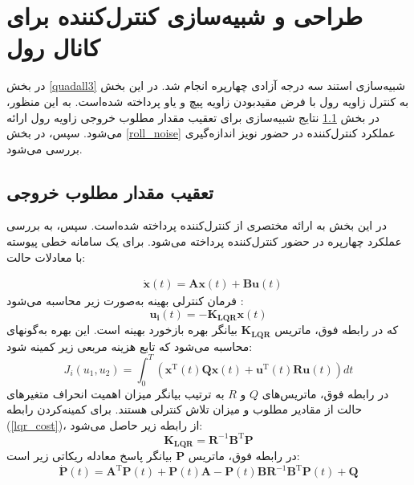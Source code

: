 \section{طراحی و شبیه‌سازی کنترل‌کننده برای کانال رول}\label{roll_lqr_section_simulation}
در بخش
\ref{quadall3}
شبیه‌سازی استند سه درجه آزادی چهارپره انجام شد.
در این بخش به کنترل زاویه رول با فرض مقید‌بودن زاویه پیچ و یاو پرداخته شده‌است. به این منظور، در بخش
\ref{roll_regulator}
نتایج شبیه‌سازی برای تعقیب مقدار مطلوب خروجی زاویه رول ارائه می‌شود. سپس، در بخش
\ref{roll_noise}
عملکرد کنترل‌کننده در  حضور نویز اندازه‌گیری بررسی می‌شود.
\subsection{تعقیب مقدار مطلوب خروجی}\label{roll_regulator}


 در این بخش به ارائه مختصری از کنترل‌کننده  پرداخته شده‌است. سپس، به بررسی عملکرد چهارپره در حضور کنترل‌کننده  پرداخته می‌شود.
 برای یک سامانه خطی پیوسته با معادلات حالت:

\begin{equation}
	\begin{split}
		&\boldsymbol{\dot x}(t) = \boldsymbol{Ax}(t) + \boldsymbol{Bu}(t) %
	\end{split}
\end{equation}
فرمان کنترلی بهینه  به‌صورت زیر محاسبه می‌شود
\cite{ogata2010modern}:
\begin{equation}
		\boldsymbol{u_i}(t) = -\boldsymbol{K_{LQR}}\boldsymbol{x}(t)
\end{equation}
که در رابطه فوق، ماتریس $\boldsymbol{K_{LQR}}$ بیانگر بهره بازخورد بهینه است. این بهره به‌گونهای محاسبه می‌شود که تابع هزینه مربعی زیر کمینه شود:
 \begin{equation}\label{lqr_cost}
	J_i(u_1, u_2) = \int_{0}^{T}\left( \boldsymbol{x} ^\mathrm{T}(t) \boldsymbol{Q} \boldsymbol{x}(t)+
	\boldsymbol{u} ^\mathrm{T}(t) \boldsymbol{R} \boldsymbol{u}(t)
	\right)dt
\end{equation}
در رابطه فوق، ماتریس‌های $Q$ و $R$ به ترتیب بیانگر میزان اهمیت انحراف متغیرهای حالت از مقادیر مطلوب و میزان تلاش کنترلی هستند. برای کمینه‌کردن رابطه
(\ref{lqr_cost})،
از رابطه زیر حاصل می‌شود:
\begin{equation}
	\boldsymbol{K_{LQR}} = \boldsymbol{R}^{-1}\boldsymbol{B}^\mathrm{T}\boldsymbol{P}
\end{equation}
در رابطه فوق، ماتریس $\boldsymbol{P}$ بیانگر پاسخ معادله ریكاتی زیر است:
\begin{equation}
	\boldsymbol{\dot{P}}(t) = \boldsymbol{A}^\mathrm{T} \boldsymbol{P}(t)  + \boldsymbol{P}(t) \boldsymbol{A} - \boldsymbol{P}(t) \boldsymbol{B} \boldsymbol{R}^{-1}\boldsymbol{B}^\mathrm{T} \boldsymbol{P}(t) + \boldsymbol{Q}
\end{equation}


